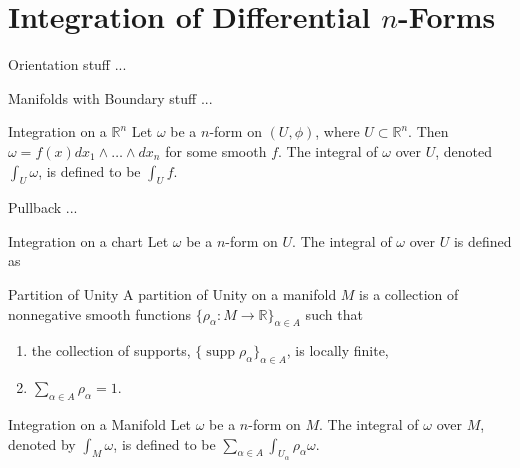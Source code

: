 \documentclass[9pt]{beamer}
\DeclareMathOperator{\supp}{supp}
\begin{document}
\section{Integration of Differential $n$-Forms}
\begin{frame}
    \begin{block}{Orientation}
        stuff ...
    \end{block}
\end{frame}

\begin{frame}
    \begin{block}{Manifolds with Boundary}
        stuff ...
    \end{block}
\end{frame}

\begin{frame}
    \begin{block}{Integration on a $\mathbb{R}^n$}
        Let $\omega$ be a $n$-form on $(U, \phi)$, where $U\subset\mathbb{R}^n$. Then $\omega=f(x)dx_1\wedge\dots\wedge dx_n$ for some smooth $f$. The integral of $\omega$ over $U$, denoted $\int_U\omega$, is defined to be $\int_U f$.
    \end{block}

    \begin{block}{Pullback}
        ...
    \end{block}

    \begin{block}{Integration on a chart}
        Let $\omega$ be a $n$-form on $U$. The integral of $\omega$ over $U$ is defined as 
    \end{block}
\end{frame}

\begin{frame}
    \begin{block}{Partition of Unity}
        A partition of Unity on a manifold $M$ is a collection of nonnegative smooth functions $\{\rho_\alpha:M \rightarrow \mathbb{R}\}_{\alpha\in A}$ such that \begin{enumerate}[i]
            \item the collection of supports, $\{\supp\rho_\alpha\}_{\alpha\in A}$, is locally finite,
            \item $\sum_{\alpha\in A} \rho_\alpha = 1.$
        \end{enumerate}
    \end{block}

    \begin{block}{Integration on a Manifold}
        Let $\omega$ be a $n$-form on $M$. The integral of $\omega$ over $M$, denoted by $\int_M \omega$, is defined to be $\sum_{\alpha\in A}\int_{U_\alpha}\rho_\alpha\omega$.
    \end{block}
\end{frame}
\end{document}
